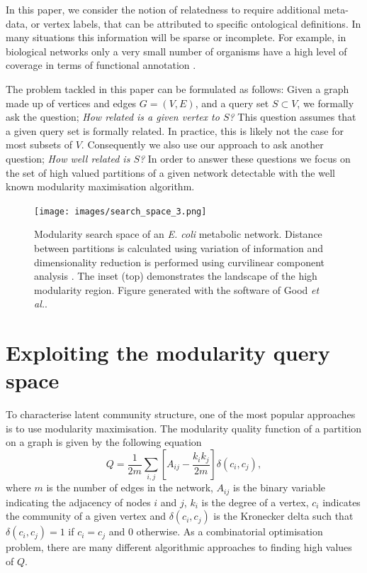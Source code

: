 \documentclass[sigconf]{acmart}
\begin{document}
In this paper, we consider the notion of relatedness to require additional meta-data, or vertex labels, that can be attributed to specific ontological definitions.
In many situations this information will be sparse or incomplete.
For example, in biological networks only a very small number of organisms have a high level of coverage in terms of functional annotation \cite{bassel2012systems}.

The problem tackled in this paper can be formulated as follows:
Given a graph made up of vertices and edges $G = (V, E)$, and a query set $S \subset V$, we formally ask the question; \textit{How related is a given vertex to $S$?}
This question assumes that a given query set is formally related.
In practice, this is likely not the case for most subsets of $V$.
Consequently we also use our approach to ask another question; \textit{How well related is $S$?}
In order to answer these questions we focus on the set of high valued partitions of a given network detectable with the well known modularity maximisation algorithm.

\begin{figure}[ht]
    \texttt{[image: images/search\_space\_3.png]}
    \caption{Modularity search space of an \textit{E. coli} metabolic network.
 Distance between partitions is calculated using variation of information \cite{meilua2003comparing} and dimensionality reduction is performed using curvilinear component analysis \cite{demartines1997curvilinear}.
  The inset (top) demonstrates the landscape of the high modularity region. 
  Figure generated with the software of Good \textit{et al.}\cite{good2010performance}.}
    \label{fig:modular_search_space}
\end{figure}

\section{Exploiting the modularity query space}
To characterise latent community structure, one of the most popular approaches is to use modularity maximisation.
The modularity quality function of a partition on a graph is given by the following equation \cite{newman2004}
\begin{equation}\label{eq:modularity}
  Q = \frac{1}{2m}\sum_{i,j} \left[A_{ij} - \frac{k_i k_j}{2m}\right]\delta(c_i, c_j),
\end{equation}
where $m$ is the number of edges in the network, $A_{ij}$ is the binary variable indicating the adjacency of nodes $i$ and $j$, $k_i$ is the degree of a vertex, $c_i$ indicates the community of a given vertex and $\delta(c_i, c_j)$ is the Kronecker delta such that $\delta(c_i, c_j) = 1$ if $c_i = c_j$ and $0$ otherwise.
As a combinatorial optimisation problem, there are many different algorithmic approaches to finding high values of $Q$.
\end{document}
